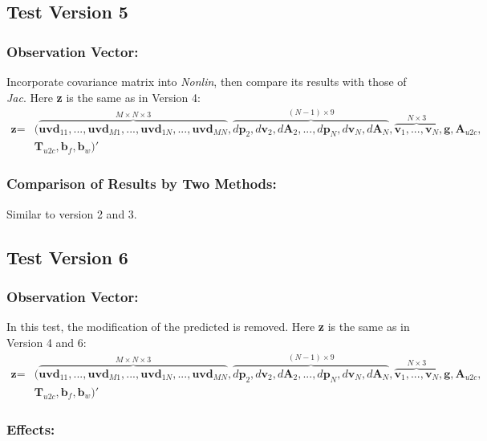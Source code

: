 \documentclass[12pt]{article}   %
\begin{document}
\subsection{Test Version 5}
\subsubsection{Observation Vector:}
Incorporate covariance matrix into \textit{Nonlin}, then compare its results with those of \textit{Jac}. Here \textbf{z} is the same as in Version 4:
\begin{align*}
\textbf{z}=&(\overbrace{\textbf{uvd}_{11}, ... , \textbf{uvd}_{M1}, ..., \textbf{uvd}_{1N}, ... , \textbf{uvd}_{MN}}^{M \times N \times 3}, \overbrace{d\textbf{p}_2, d\textbf{v}_2, d\textbf{A}_2, ..., d\textbf{p}_N, d\textbf{v}_N, d\textbf{A}_N}^{(N-1) \times 9}, \overbrace{\textbf{v}_1, ..., \textbf{v}_{N}}^{N \times 3},  \textbf{g}, \textbf{A}_{u2c},\\
 &\textbf{T}_{u2c}, \textbf{b}_f, \textbf{b}_w)' 
 \end{align*}

\subsubsection{Comparison of Results by Two Methods:}	

Similar to version 2 and 3.

\subsection{Test Version 6}
\subsubsection{Observation Vector:}
In this test, the modification of the predicted is removed. Here \textbf{z} is the same as in Version 4 and 6:
\begin{align*}
\textbf{z}=&(\overbrace{\textbf{uvd}_{11}, ... , \textbf{uvd}_{M1}, ..., \textbf{uvd}_{1N}, ... , \textbf{uvd}_{MN}}^{M \times N \times 3}, \overbrace{d\textbf{p}_2, d\textbf{v}_2, d\textbf{A}_2, ..., d\textbf{p}_N, d\textbf{v}_N, d\textbf{A}_N}^{(N-1) \times 9}, \overbrace{\textbf{v}_1, ..., \textbf{v}_{N}}^{N \times 3},  \textbf{g}, \textbf{A}_{u2c},\\
 &\textbf{T}_{u2c}, \textbf{b}_f, \textbf{b}_w)' 
 \end{align*}

\subsubsection{Effects:}	
\end{document}
